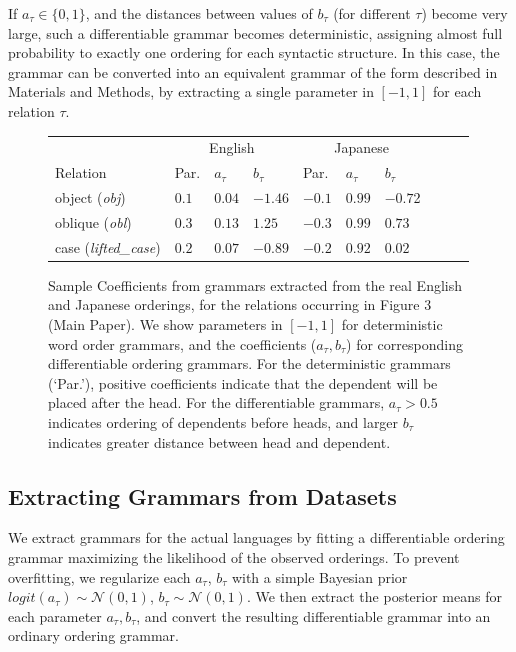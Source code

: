\documentclass[10pt,twoside,lineno]{article}
\begin{document}
If $a_\tau \in \{0, 1\}$, and the distances between values of $b_\tau$ (for different $\tau$) become very large, such a differentiable grammar becomes deterministic, assigning almost full probability to exactly one ordering for each syntactic structure.
In this case, the grammar can be converted into an equivalent grammar of the form described in Materials and Methods, by extracting a single parameter in $[-1, 1]$ for each relation $\tau$.


\begin{figure}
	\begin{center}
\begin{tabular}{l||l|ll||l|lllll}
	& \multicolumn{3}{c||}{English}    &  \multicolumn{3}{c}{Japanese}  \\ 
	Relation                     &  Par.   & $a_\tau$ & $b_\tau$            & Par.   & $a_\tau$ & $b_\tau$     \\ \hline \hline
	object (\textit{obj})        &  $0.1$   &   $0.04$   & $-1.46$            & $-0.1$  & $0.99$ & $-0.7$2 \\
	oblique (\textit{obl})       &  $0.3$   &   $0.13$     & $1.25$             & $-0.3$  & $0.99$ & $0.73$ \\
	case (\textit{lifted\_case}) &  $0.2$   &   $0.07$       &   $-0.89$         & $-0.2$  &  $0.92$ & $0.02$  \\
\end{tabular}
	\end{center}
	\caption{Sample Coefficients from grammars extracted from the real English and Japanese orderings, for the relations occurring in Figure 3 (Main Paper). We show parameters in $[-1,1]$ for deterministic word order grammars, and the coefficients ($a_\tau, b_\tau$) for corresponding differentiable ordering grammars. For the deterministic grammars (`Par.'), positive coefficients indicate that the dependent will be placed after the head. For the differentiable grammars, $a_\tau > 0.5$ indicates ordering of dependents before heads, and larger $b_\tau$ indicates greater distance between head and dependent.}\label{fig:grammar-sample}
\end{figure}


\subsection{Extracting Grammars from Datasets}
We extract grammars for the actual languages by fitting a differentiable ordering grammar maximizing the likelihood of the observed orderings.
To prevent overfitting, we regularize each $a_\tau$, $b_\tau$ with a simple Bayesian prior $logit(a_\tau) \sim \mathcal{N}(0,1)$, $b_\tau \sim \mathcal{N}(0,1)$.
We then extract the posterior means for each parameter $a_\tau, b_\tau$, and convert the resulting differentiable grammar into an ordinary ordering grammar.
\end{document}
